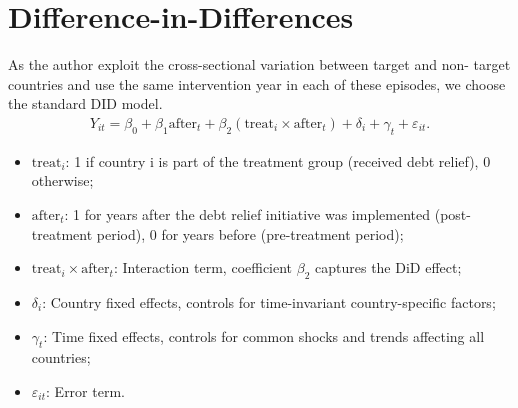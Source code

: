 \section{Difference-in-Differences}
As the author exploit the cross-sectional variation between target and non-
target countries and use the same intervention year in each of these episodes,
we choose the standard DID model.
\begin{gather*}
    Y_{it} = \beta_0 + \beta_1 \text{after}_t + \beta_2 (\text{treat}_i \times \text{after}_t) + \delta_i + \gamma_t + \varepsilon_{it}.
\end{gather*}
\begin{itemize}
    \item $\text{treat}_i$: 1 if country i is part of the treatment group (received debt relief), 0 otherwise;
    \item $\text{after}_t$: 1 for years after the debt relief initiative was implemented (post-treatment period), 0 for years before (pre-treatment period);
    \item $ \text{treat}_i \times \text{after}_t $: Interaction term, coefficient $\beta_2$ captures the DiD effect;
    \item $\delta_i$: Country fixed effects, controls for time-invariant country-specific factors;
    \item $\gamma_t$: Time fixed effects, controls for common shocks and trends affecting all countries;
    \item $\varepsilon_{it}$: Error term.
\end{itemize}
